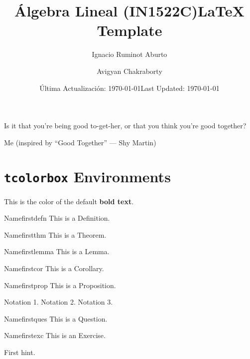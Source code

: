 \documentclass[12pt]{scrartcl}
\title{\textcolor{bubured}{Álgebra Lineal (IN1522C)}}
\author{\textcolor{bubured}{Ignacio Ruminot Aburto}}
\date{\textcolor{bubured}{Última Actualización: \today}}
\begin{document}
\maketitle

\title{LaTeX Template}
\author{Avigyan Chakraborty}
\date{Last Updated: \today}

\epigraph{Is it that you're being good to-get-her, or that you think
you're good together?}{Me (inspired by “Good Together” --- Shy Martin)}

\tableofcontents

\newpage

\section{\texttt{tcolorbox} Environments}

This is the color of the default \textbf{bold text}.

\begin{definition}{Name}{firstdefn}
  This is a Definition.
\end{definition}

\begin{theorem}{Name}{firstthm}
  This is a Theorem.
\end{theorem}

\begin{lemma}{Name}{firstlemma}
  This is a Lemma.
\end{lemma}

\begin{corollary}{Name}{firstcor}
  This is a Corollary.
\end{corollary}

\begin{proposition}{Name}{firstprop}
  This is a Proposition.
\end{proposition}

\begin{notation}{}{}
  \begin{itemize}
      \ii Notation 1.
      \ii Notation 2.
      \ii Notation 3.
  \end{itemize}
\end{notation}

\begin{question}{Name}{firstques}
  This is a Question.
\end{question}

\begin{exercise}{Name}{firstexc}
  This is an Exercise.
\end{exercise}
\begin{hints}{}{}
  \begin{hint}
    First hint.
  \end{hint}
\end{hints}
\end{document}
